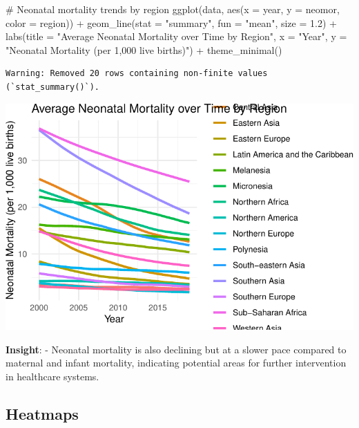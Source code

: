 \documentclass[
  letterpaper,
  DIV=11,
  numbers=noendperiod]{scrartcl}
\newenvironment{Shaded}{\begin{snugshade}}{\end{snugshade}}
\newcommand{\AttributeTok}[1]{\textcolor[rgb]{0.40,0.45,0.13}{#1}}
\newcommand{\CommentTok}[1]{\textcolor[rgb]{0.37,0.37,0.37}{#1}}
\newcommand{\FloatTok}[1]{\textcolor[rgb]{0.68,0.00,0.00}{#1}}
\newcommand{\FunctionTok}[1]{\textcolor[rgb]{0.28,0.35,0.67}{#1}}
\newcommand{\NormalTok}[1]{\textcolor[rgb]{0.00,0.23,0.31}{#1}}
\newcommand{\SpecialCharTok}[1]{\textcolor[rgb]{0.37,0.37,0.37}{#1}}
\newcommand{\StringTok}[1]{\textcolor[rgb]{0.13,0.47,0.30}{#1}}
\begin{document}
\begin{Shaded}
\begin{Highlighting}[]
\CommentTok{\# Neonatal mortality trends by region}
\FunctionTok{ggplot}\NormalTok{(data, }\FunctionTok{aes}\NormalTok{(}\AttributeTok{x =}\NormalTok{ year, }\AttributeTok{y =}\NormalTok{ neomor, }\AttributeTok{color =}\NormalTok{ region)) }\SpecialCharTok{+}
  \FunctionTok{geom\_line}\NormalTok{(}\AttributeTok{stat =} \StringTok{"summary"}\NormalTok{, }\AttributeTok{fun =} \StringTok{"mean"}\NormalTok{, }\AttributeTok{size =} \FloatTok{1.2}\NormalTok{) }\SpecialCharTok{+}
  \FunctionTok{labs}\NormalTok{(}\AttributeTok{title =} \StringTok{"Average Neonatal Mortality over Time by Region"}\NormalTok{, }\AttributeTok{x =} \StringTok{"Year"}\NormalTok{, }\AttributeTok{y =} \StringTok{"Neonatal Mortality (per 1,000 live births)"}\NormalTok{) }\SpecialCharTok{+}
  \FunctionTok{theme\_minimal}\NormalTok{()}
\end{Highlighting}
\end{Shaded}

\begin{verbatim}
Warning: Removed 20 rows containing non-finite values (`stat_summary()`).
\end{verbatim}

\includegraphics{EDA_files/figure-pdf/unnamed-chunk-12-1.pdf}

\textbf{Insight}: - Neonatal mortality is also declining but at a slower
pace compared to maternal and infant mortality, indicating potential
areas for further intervention in healthcare systems.

\subsection{Heatmaps}\label{heatmaps}
\end{document}

